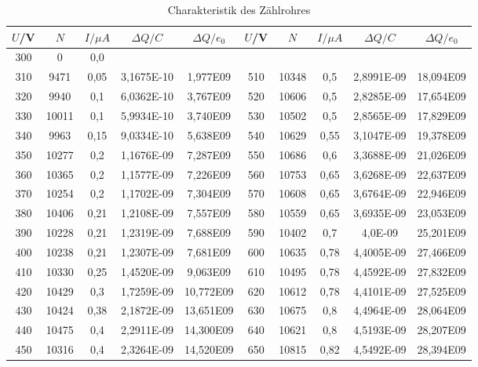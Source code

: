 \begin{table}[h!]
  \centering
  \caption{Charakteristik des Zählrohres}
  \label{tab:N/U}
  \begin{tabular}{c c c c c c c c c c}
    \toprule
      $U$/V & $N$ & $I/\mu A$  &$  \Delta Q/C  $&$\Delta Q/e_0 $& $U$/V & $N$ & $I/\mu A$ &$ \Delta Q /C $&$ \Delta Q/e_0$\\
    \midrule

      300	&	0    &  0,0    &          &            &      &        &      &           &            \\
      310	&	9471 &  0,05   &3,1675E-10& 	 1,977E09& 510	&	10348  &0,5   & 2,8991E-09& 	18,094E09\\
      320	&	9940 &  0,1    &6,0362E-10& 	 3,767E09& 520	&	10606  &0,5   & 2,8285E-09& 	17,654E09\\
      330	&	10011&  0,1    &5,9934E-10& 	 3,740E09& 530	&	10502  &0,5   & 2,8565E-09& 	17,829E09\\
      340	&	9963 &  0,15   &9,0334E-10& 	 5,638E09& 540	&	10629  &0,55  & 3,1047E-09& 	19,378E09\\
      350	&	10277&  0,2    &1,1676E-09& 	 7,287E09& 550	&	10686  &0,6   & 3,3688E-09& 	21,026E09\\
      360	&	10365&  0,2    &1,1577E-09& 	 7,226E09& 560	&	10753  &0,65  & 3,6268E-09& 	22,637E09\\
      370	&	10254&  0,2    &1,1702E-09& 	 7,304E09& 570	& 10608  &0,65  & 3,6764E-09& 	22,946E09\\
      380	&	10406&  0,21   &1,2108E-09& 	 7,557E09& 580	& 10559  &0,65  & 3,6935E-09& 	23,053E09\\
      390	&	10228&  0,21   &1,2319E-09& 	 7,688E09& 590	& 10402  &0,7   & 4,0E-09	  &   25,201E09\\
      400	&	10238&  0,21   &1,2307E-09& 	 7,681E09& 600	& 10635  &0,78  & 4,4005E-09& 	27,466E09\\
      410	&	10330&  0,25   &1,4520E-09& 	 9,063E09& 610	& 10495  &0,78  & 4,4592E-09& 	27,832E09\\
      420	&	10429&  0,3    &1,7259E-09& 	10,772E09& 620	& 10612  &0,78  & 4,4101E-09& 	27,525E09\\
      430	&	10424&  0,38   &2,1872E-09& 	13,651E09& 630	& 10675  &0,8   & 4,4964E-09& 	28,064E09\\
      440	&	10475&  0,4    &2,2911E-09& 	14,300E09& 640	& 10621  &0,8   & 4,5193E-09& 	28,207E09\\
      450	&	10316&  0,4    &2,3264E-09& 	14,520E09& 650	& 10815  &0,82  & 4,5492E-09& 	28,394E09\\

\end{tabular}
\end{table}
